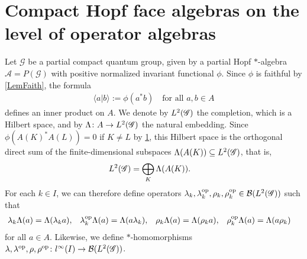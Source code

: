 \section{Compact Hopf face algebras on the level of operator algebras}



Let $\mathscr{G}$ be a partial compact quantum group, given by a
partial Hopf $*$-algebra $\mathscr{A}=P(\mathscr{G})$ with positive
normalized invariant functional $\phi$.  Since $\phi$ is faithful by
\ref{LemFaith},  the formula
\begin{align*}
  \langle a|b\rangle :=\phi(a^{*}b) \quad \text{for all } a,b\in A
\end{align*}
defines an inner product on $A$. We denote by $L^{2}(\mathscr{G})$ the completion,
which is a Hilbert space, and by $\Lambda \colon A \to L^{2}(\mathscr{G})$ the
natural embedding. Since $\phi(A(K)^{*}A(L)) = 0$ if $K\neq L$ by
\ref{}, this Hilbert space is the orthogonal direct sum of
the finite-dimensional subspaces  $\Lambda(A(K)) \subseteq L^{2}(\mathscr{G})$, that is,
\begin{align*}
  L^{2}(\mathscr{G}) &= \bigoplus_{K} \Lambda(A(K)).
\end{align*}
 For each $k\in I$, we can therefore define operators
$\lambda_{k},\lambda_{k}^{\operatorname{\mathrm{op}}},\rho_{k},\rho_{k}^{\operatorname{\mathrm{op}}}\in {\cal
  B}(L^{2}(\mathscr{G}))$ such that
\begin{align*}
  \lambda_{k}\Lambda(a)&= \Lambda(\lambda_{k} a), &
  \lambda^{\operatorname{\mathrm{op}}}_{k}\Lambda(a) &= \Lambda(a\lambda_{k}), &
  \rho_{k}\Lambda(a) &= \Lambda(\rho_{k}a), &
  \rho_{k}^{\operatorname{\mathrm{op}}}\Lambda(a) &= \Lambda(a\rho_{k})
\end{align*}
for all $a\in A$. Likewise, we define $*$-homomorphisms
$\lambda,\lambda^{\operatorname{\mathrm{op}}},\rho,\rho^{\operatorname{\mathrm{op}}} \colon l^{\infty}(I) \to {\cal
  B}(L^{2}(\mathscr{G}))$.


